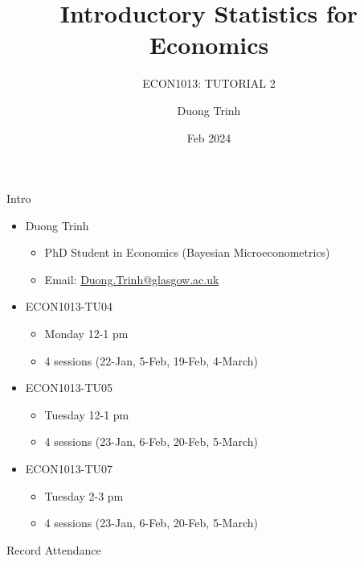 \documentclass[
  11pt,
  ignorenonframetext,
]{beamer}
\title{Introductory Statistics for Economics}
\subtitle{ECON1013: TUTORIAL 2}
\author{Duong Trinh}
\date{Feb 2024}
\institute{University of Glasgow}
\providecommand{\tightlist}{%
  \setlength{\itemsep}{0pt}\setlength{\parskip}{0pt}}
\begin{document}
\frame{\titlepage}

\begin{frame}{Intro}
\protect\hypertarget{intro}{}
\begin{itemize}
\tightlist
\item
  Duong Trinh

  \begin{itemize}
  \tightlist
  \item
    PhD Student in Economics (Bayesian Microeconometrics)
  \item
    Email: \underline{Duong.Trinh@glasgow.ac.uk}
  \end{itemize}
\end{itemize}

\vspace{3mm}

\begin{itemize}
\tightlist
\item
  ECON1013-TU04

  \begin{itemize}
  \tightlist
  \item
    Monday 12-1 pm
  \item
    4 sessions (22-Jan, 5-Feb, 19-Feb, 4-March)
  \end{itemize}
\item
  ECON1013-TU05

  \begin{itemize}
  \tightlist
  \item
    Tuesday 12-1 pm
  \item
    4 sessions (23-Jan, 6-Feb, 20-Feb, 5-March)
  \end{itemize}
\item
  ECON1013-TU07

  \begin{itemize}
  \tightlist
  \item
    Tuesday 2-3 pm
  \item
    4 sessions (23-Jan, 6-Feb, 20-Feb, 5-March)
  \end{itemize}
\end{itemize}
\end{frame}

\begin{frame}{Record Attendance}
\protect\hypertarget{record-attendance}{}
\end{frame}
\end{document}
